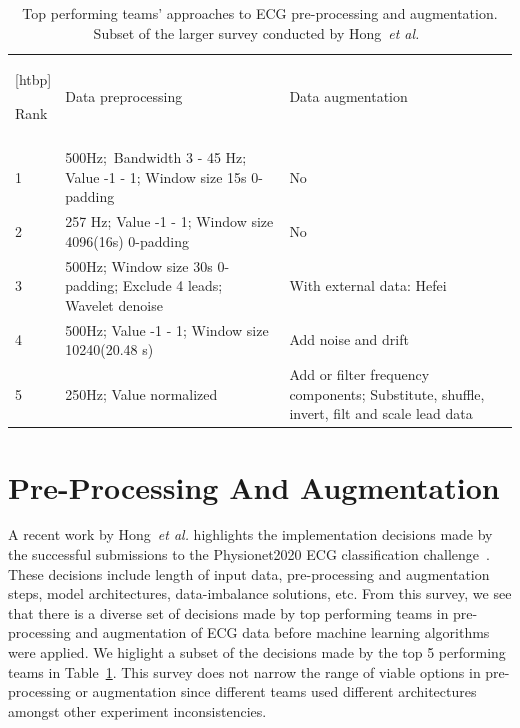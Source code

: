 \documentclass{article}
\begin{document}
\begin{table}[tpb]
\centering
\begin{tabular}{lll}[htbp]

Rank &                                                                 Data preprocessing &                                                                          Data augmentation \\
                                             \\
1    &  500Hz;\ Bandwidth 3 - 45 Hz; Value -1 - 1; Window size 15s 0-padding &                                                                                         No \\
2    &                257 Hz; Value -1 - 1; Window size 4096(16s) 0-padding &                                                                                         No \\
3    &   500Hz; Window size 30s 0-padding; Exclude 4 leads; Wavelet denoise &                                                                  With external data: Hefei \\
4    &                     500Hz; Value -1 - 1; Window size 10240(20.48 s)  &                                                                        Add noise and drift \\
5    &                                              250Hz; Value normalized &  Add or filter frequency components; Substitute, shuffle, invert, filt and scale lead data \\
\end{tabular}
\caption{Top performing teams' approaches to ECG pre-processing and augmentation. Subset of the larger survey conducted by Hong~\textit{et al.}~\cite{hong2022practical}}
\label{tab:hong_top5}
\end{table}

\section{Pre-Processing And Augmentation}
\label{sec:processing}

A recent work by Hong~\textit{et al.} highlights the implementation decisions made by the successful submissions to the Physionet2020 ECG classification challenge~\cite{hong2022practical}. These decisions include length of input data, pre-processing and augmentation steps, model architectures, data-imbalance solutions, etc. From this survey, we see that there is a diverse set of decisions made by top performing teams in pre-processing and augmentation of ECG data before machine learning algorithms were applied. We higlight a subset of the decisions made by the top 5 performing teams in Table~\ref{tab:hong_top5}.  This survey does not narrow the range of viable options in pre-processing or augmentation since different teams used different architectures amongst other experiment inconsistencies. 
\end{document}
